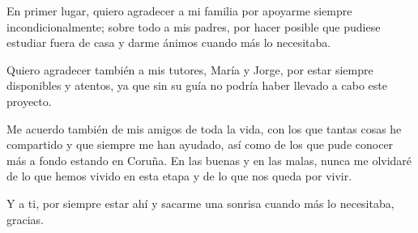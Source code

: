\documentclass[11pt,a4paper,titlepage,oneside]{report}
\begin{document}

 
 \paxinaenbranco
 \begin{agradecementos}

    En primer lugar, quiero agradecer a mi familia por apoyarme siempre incondicionalmente; sobre todo a mis padres, por hacer posible que pudiese estudiar fuera de casa y darme ánimos cuando más lo necesitaba.

    Quiero agradecer también a mis tutores, María y Jorge, por estar siempre disponibles y atentos, ya que sin su guía no podría haber llevado a cabo este proyecto.

    Me acuerdo también de mis amigos de toda la vida, con los que tantas cosas he compartido y que siempre me han ayudado, así como de los que pude conocer más a fondo estando en Coruña.
    En las buenas y en las malas, nunca me olvidaré de lo que hemos vivido en esta etapa y de lo que nos queda por vivir.

    Y a ti, por siempre estar ahí y sacarme una sonrisa cuando más lo necesitaba, gracias.
 \end{agradecementos}
 

 \setcounter{page}{1}

 \tableofcontents
 \listoffigures
 \listoftables
 \lstlistoflistings
 \clearpage
 
 \setcounter{page}{1}


 
 
 
 
 
 
 


 \appendix
 \appendixpage
 

 \printglossary[type=\acronymtype,title=\nomeglosarioacronimos]
 \printglossary[title=\nomeglosariotermos]

 
 
 \clearpage
 
\end{document}
